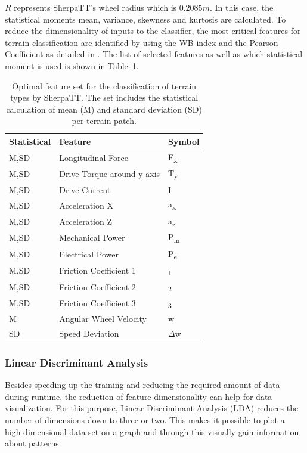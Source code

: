 \documentclass{article}
\begin{document}
$R$ represents SherpaTT's wheel radius which is $0.2085m$.
In this case, the statistical moments mean, variance, skewness and kurtosis are calculated. 
To reduce the dimensionality of inputs to the classifier, the most critical features for terrain classification are identified by using the WB index and the Pearson Coefficient as detailed in \cite{Dimastrogiovanni2020}. 
The list of selected features as well as which statistical moment is used is shown in Table~\ref{fig:optiF}.

\begin{table}[htb!]
   \centering
    \caption{Optimal feature set for the classification of terrain types by SherpaTT. The set includes the statistical calculation of mean (M) and standard deviation (SD) per terrain patch.\label{fig:optiF}}
    \begin{tabularx}{\columnwidth}{XXX}
    \textbf{Statistical} & \textbf{Feature}  & \textbf{Symbol} \\
    \hline
     M,SD	&  Longitudinal Force	 & F\textsubscript{x} \\ 
     M,SD	&  Drive Torque	around y-axis  & T\textsubscript{y} \\ 
     M,SD	&  Drive Current	 & I \\  
     M,SD	&  Acceleration X	 &  a\textsubscript{x}\\ 
     M,SD	&  Acceleration Z	 & a\textsubscript{z} \\ 
     M,SD	&  Mechanical Power	 & P\textsubscript{m} \\ 
     M,SD	&  Electrical Power	 & P\textsubscript{e} \\ 
     M,SD	&  Friction Coefficient 1	 & \textmu \textsubscript{1} \\ 
     M,SD	&  Friction Coefficient 2 & \textmu \textsubscript{2}\\ 
     M,SD	&  Friction Coefficient 3	 & \textmu \textsubscript{3}\\ 
     M	    &  Angular Wheel Velocity	     &  w      \\ 
     SD    	&  Speed Deviation	 & $\Delta$w\\ 
    \end{tabularx}	
\end{table}

\subsubsection{Linear Discriminant Analysis}
Besides speeding up the training and reducing the required amount of data during runtime, the reduction of feature dimensionality can help for data visualization. For this purpose, Linear Discriminant Analysis (LDA) reduces the number of dimensions down to three or two. This makes it possible to plot a high-dimensional data set on a graph and through this visually gain information about patterns. 
\end{document}
